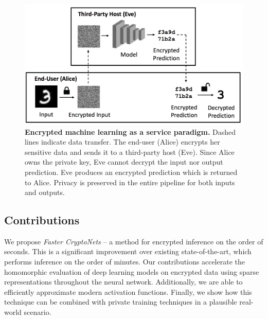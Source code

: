 \documentclass[conference]{IEEEtran}
\begin{document}
\begin{figure}[t]
    \centering
    \includegraphics[width=1.0\linewidth]{figures/pull/pull.jpg}
    \vspace{-5mm}
    \caption{\textbf{Encrypted machine learning as a service paradigm.} Dashed lines indicate data transfer. The end-user (Alice) encrypts her sensitive data and sends it to a third-party host (Eve). Since Alice owns the private key, Eve cannot decrypt the input nor output prediction. Eve produces an encrypted prediction which is returned to Alice. Privacy is preserved in the entire pipeline for both inputs and outputs.}
    \label{fig:pull}
\end{figure}

\subsection{Contributions}

We propose \textit{Faster CryptoNets} -- a method for encrypted inference on the order of seconds.
This is a significant improvement over existing state-of-the-art, which performs inference on the order of minutes.
Our contributions accelerate the homomorphic evaluation of deep learning models on encrypted data using sparse representations throughout the neural network.
Additionally, we are able to efficiently approximate modern activation functions.  
Finally, we show how this technique can be combined with private training techniques in a plausible real-world scenario.
\end{document}
